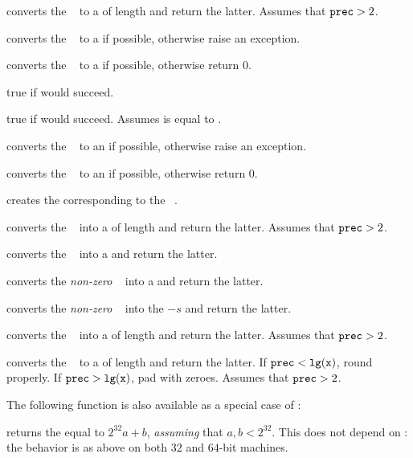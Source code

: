 
 converts the ~ to a
 of length  and return the latter.
Assumes that ${\tt prec} > 2$.

 converts the ~ to a  if
possible, otherwise raise an exception.

 converts the ~ to a  if
possible, otherwise return $0$.

 true if  would succeed.

 true if  would succeed.
Assumes  is equal to .

 converts the ~ to an  if
possible, otherwise raise an exception.

 converts the ~ to an
 if possible, otherwise return $0$.

 creates the  corresponding to the
~.

 converts the ~ into a
 of length  and return the latter. Assumes that
${\tt prec} > 2$.

 converts the ~ into a 
and return the latter.

 converts the \emph{non-zero} ~
into a  and return the latter.

 converts the \emph{non-zero} ~
into the  $-s$ and return the latter.

 converts the ~ into a
 of length  and return the latter. Assumes that
${\tt prec} > 2$.

 converts the ~ to a
 of length  and return the latter. If
${\tt prec} < {\tt lg(x)}$, round properly. If ${\tt prec} > {\tt lg(x)}$,
pad with zeroes. Assumes that ${\tt prec} > 2$.

\noindent The following function is also available as a special case of
:

 returns the  equal to $2^{32} a +
b$, \emph{assuming} that $a,b < 2^{32}$. This does not depend on
: the behavior is as above on both $32$ and $64$-bit
machines.

